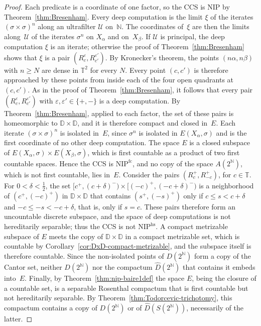 \documentclass[psamsfonts]{amsart}
\theoremstyle{definition}
\theoremstyle{remark}
\newcommand{\NIP}{\text{NIP}}
\numberwithin{equation}{section}
\begin{document}
\begin{proof}
Each predicate is a coordinate of one factor, so the CCS is $\NIP$ by Theorem~\ref{thm:Bresenham}.
Every deep computation is the limit $\xi$ of the iterates $(\sigma\times\sigma)^n$ along an ultrafilter $\mathcal{U}$ on~$\mathbb{N}$.
The coordinates of~$\xi$ are then the limits along~$\mathcal{U}$ of the iterates $\sigma^n$ on $X_\alpha$ and on~$X_\beta$.
If $\mathcal{U}$ is principal, the deep computation $\xi$ is an iterate;
otherwise the proof of Theorem~\ref{thm:Bresenham} shows that $\xi$ is a pair $(R_c^\varepsilon,R_{c'}^{\varepsilon'})$.
By Kronecker's theorem, the points $(n\alpha,n\beta)$ with $n\ge N$ are dense in $\mathbb{T}^2$ for every $N$.
Every point $(c,c')$ is therefore approached by these points from inside each of the four open quadrants at $(c,c')$.
As in the proof of Theorem~\ref{thm:Bresenham}, it follows that every pair $(R_c^\varepsilon,R_{c'}^{\varepsilon'})$ with $\varepsilon,\varepsilon'\in\{+,-\}$ is a deep computation.
By Theorem~\ref{thm:Bresenham}, applied to each factor, the set of these pairs is homeomorphic to $\mathbb{D}\times\mathbb{D}$, and it is therefore compact and closed in~$E$.
Each iterate $(\sigma\times\sigma)^n$ is isolated in~$E$, since $\sigma^n$ is isolated in $E(X_\alpha,\sigma)$ and is the first coordinate of no other deep computation.
The space $E$ is a closed subspace of $E(X_\alpha,\sigma)\times E(X_\beta,\sigma)$, which is first countable as a product of two first countable spaces.
Hence the CCS is $\NIP^{\mathrm{fc}}$, and no copy of the space $A(2^{\mathbb{N}})$, which is not first countable, lies in~$E$.
Consider the pairs $(R_c^+,R_{-c}^+)$, for $c\in\mathbb{T}$.
For $0<\delta<\frac12$, the set $[c^+,(c+\delta)^-)\times[(-c)^+,(-c+\delta)^-)$ is a neighborhood of $(c^+,(-c)^+)$ in $\mathbb{D}\times\mathbb{D}$ that contains $(s^+,(-s)^+)$ only if $c\le s<c+\delta$ and $-c\le -s<-c+\delta$, that is, only if $s=c$.
These pairs therefore form an uncountable discrete subspace, and the space of deep computations is not hereditarily separable;
thus the CCS is not $\NIP^{\mathrm{hs}}$.
A compact metrizable subspace of $E$ meets the copy of $\mathbb{D}\times\mathbb{D}$ in a compact metrizable set, which is countable by Corollary~\ref{cor:DxD-compact-metrizable}, and the subspace itself is therefore countable.
Since the non-isolated points of $D(2^{\mathbb{N}})$ form a copy of the Cantor set, neither $D(2^{\mathbb{N}})$ nor the compactum $\hat D(2^{\mathbb{N}})$ that contains it embeds into~$E$.
Finally, by Theorem~\ref{thm:nip-baire1def} the space $E$, being the closure of a countable set, is a separable Rosenthal compactum that is first countable but not hereditarily separable.
By Theorem~\ref{thm:Todorcevic-trichotomy}, this compactum contains a copy of $D(2^{\mathbb{N}})$ or of $\hat D(S(2^{\mathbb{N}}))$, necessarily of the latter.
\end{proof}
\end{document}
